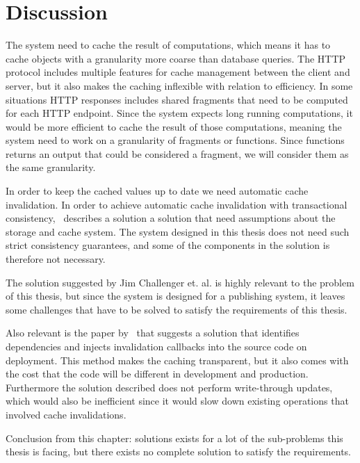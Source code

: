 \section{Discussion}

The system need to cache the result of computations, which means it has to cache objects with a granularity more coarse than database queries. The HTTP protocol includes multiple features for cache management between the client and server, but it also makes the caching inflexible with relation to efficiency. In some situations HTTP responses includes shared fragments that need to be computed for each HTTP endpoint. Since the system expects long running computations, it would be more efficient to cache the result of those computations, meaning the system need to work on a granularity of fragments or functions. Since functions returns an output that could be considered a fragment, we will consider them as the same granularity.

In order to keep the cached values up to date we need automatic cache invalidation. In order to achieve automatic cache invalidation with transactional consistency,~\cite{paper:liskov} describes a solution a solution that need assumptions about the storage and cache system. The system designed in this thesis does not need such strict consistency guarantees, and some of the components in the solution is therefore not necessary.

The solution suggested by Jim Challenger et. al. is highly relevant to the problem of this thesis, but since the system is designed for a publishing system, it leaves some challenges that have to be solved to satisfy the requirements of this thesis.

Also relevant is the paper by~\cite{paper:deploy-time} that suggests a solution that identifies dependencies and injects invalidation callbacks into the source code on deployment. This method makes the caching transparent, but it also comes with the cost that the code will be different in development and production. Furthermore the solution described does not perform write-through updates, which would also be inefficient since it would slow down existing operations that involved cache invalidations.

Conclusion from this chapter: solutions exists for a lot of the sub-problems this thesis is facing, but there exists no complete solution to satisfy the requirements.
